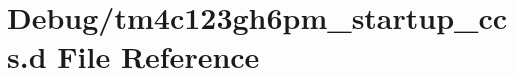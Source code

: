 \section{Debug/tm4c123gh6pm\+\_\+startup\+\_\+ccs.d File Reference}
\label{tm4c123gh6pm__startup__ccs_8d}
